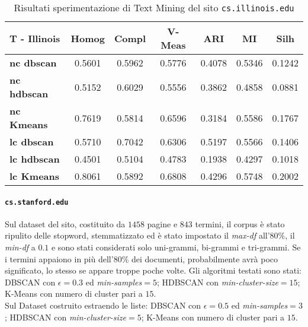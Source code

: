 \begin{table}[H]
	\begin{tabular}{| l | c | c | c | c | c | c |}
	\hline
	\textbf{T - Illinois}  & \textbf{Homog} & \textbf{Compl} & \textbf{V-Meas}  & \textbf{ARI}  & \textbf{MI}  & \textbf{Silh} \\ [3ex] \hline
	\textbf{nc dbscan} & 0.5601 & 0.5962 & 0.5776 & 0.4078 & 0.5346 & 0.1242\\ [3ex]
	 \hline 
	\textbf{nc hdbscan} & 0.5152 & 0.6029 & 0.5556 & 0.3862 & 0.4858 & 0.0881\\ [3ex]
	 \hline
	\textbf{nc Kmeans} & 0.7619 & 0.5814 & 0.6596 & 0.3184 & 0.5586 & 0.1767\\ [3ex]
	 \hline	
	\textbf{lc dbscan} & 0.5710 & 0.7042 & 0.6306 & 0.5197 & 0.5566 & 0.1406\\ [3ex]
	\hline
	\textbf{lc hdbscan} & 0.4501 & 0.5104 & 0.4783 & 0.1938 & 0.4297 & 0.1018\\ [3ex]
	\hline
	\textbf{lc Kmeans} & 0.8061 & 0.5892 & 0.6808 & 0.4296 & 0.5748 & 0.2002\\ [3ex]
	\hline
	\end{tabular}
	\caption{Risultati sperimentazione di Text Mining del sito \texttt{cs.illinois.edu}}
	\label{metricheTextIll}
\end{table}

\paragraph{\texttt{cs.stanford.edu}}
Sul dataset del sito, costituito da $1458$ pagine e $843$ termini, il corpus è stato ripulito delle stopword, stemmatizzato ed è stato impostato il \textit{max-df} all'80\%, il \textit{min-df} a $0.1$ e sono stati considerati solo uni-grammi, bi-grammi e tri-grammi. Se i termini appaiono in più dell'80\% dei documenti, probabilmente avrà poco significato, lo stesso se appare troppe poche volte. Gli algoritmi testati sono stati: DBSCAN con $\epsilon = 0.3$ ed \textit{min-samples}$ = 5$; HDBSCAN con \textit{min-cluster-size}$=15$; K-Means con numero di cluster pari a $15$. \\Sul Dataset costruito estraendo le liste: DBSCAN con $\epsilon = 0.5$ ed \textit{min-samples}$ = 3$; HDBSCAN con \textit{min-cluster-size}$=5$; K-Means con numero di cluster pari a $15$. 


